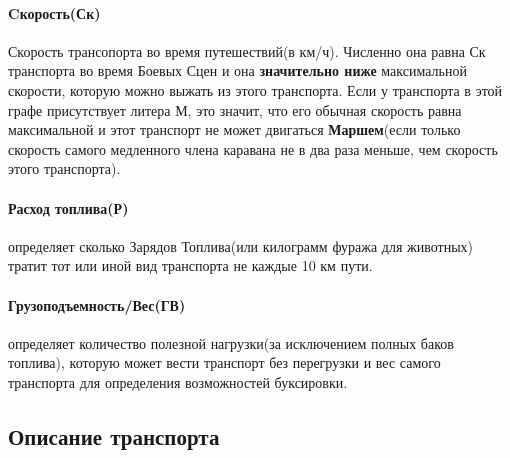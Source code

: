 \paragraph{Cкорость(Ск)} Скорость трансопорта во время путешествий(в км/ч). Численно она равна Ск транспорта во время Боевых Сцен и она \textbf{значительно ниже} максимальной скорости, которую можно выжать из этого транспорта. Если у транспорта в этой графе присутствует литера М, это значит, что его обычная скорость равна максимальной и этот транспорт не может двигаться \textbf{Маршем}(если только скорость самого медленного члена каравана не в два раза меньше, чем скорость этого транспорта).
\paragraph{Расход топлива(Р)} определяет сколько Зарядов Топлива(или килограмм фуража для животных) тратит тот или иной вид транспорта не каждые 10 км пути.
\paragraph{Грузоподъемность/Вес(ГВ)} определяет количество полезной нагрузки(за исключением полных баков топлива), которую может вести транспорт без перегрузки и вес самого транспорта для определения возможностей буксировки.

\subsection{Описание транспорта}
